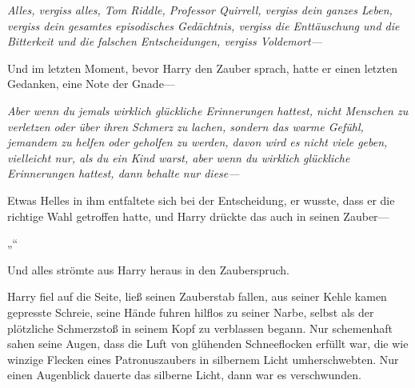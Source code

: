 \emph{Alles, vergiss alles, Tom Riddle, Professor Quirrell, vergiss dein ganzes Leben, vergiss dein gesamtes episodisches Gedächtnis, vergiss die Enttäuschung und die Bitterkeit und die falschen Entscheidungen, vergiss Voldemort—}

Und im letzten Moment, bevor Harry den Zauber sprach, hatte er einen letzten Gedanken, eine Note der Gnade—

\emph{Aber wenn du jemals wirklich glückliche Erinnerungen hattest, nicht Menschen zu verletzen oder über ihren Schmerz zu lachen, sondern das warme Gefühl, jemandem zu helfen oder geholfen zu werden, davon wird es nicht viele geben, vielleicht nur, als du ein Kind warst, aber wenn du wirklich glückliche Erinnerungen hattest, dann behalte nur diese—}

Etwas Helles in ihm entfaltete sich bei der Entscheidung, er wusste, dass er die richtige Wahl getroffen hatte, und Harry drückte das auch in seinen Zauber—

„\emph{}“

Und alles strömte aus Harry heraus in den Zauberspruch.

Harry fiel auf die Seite, ließ seinen Zauberstab fallen, aus seiner Kehle kamen gepresste Schreie, seine Hände fuhren hilflos zu seiner Narbe, selbst als der plötzliche Schmerzstoß in seinem Kopf zu verblassen begann.
Nur schemenhaft sahen seine Augen, dass die Luft von glühenden Schneeflocken erfüllt war, die wie winzige Flecken eines Patronuszaubers in silbernem Licht umherschwebten.
Nur einen Augenblick dauerte das silberne Licht, dann war es verschwunden.

